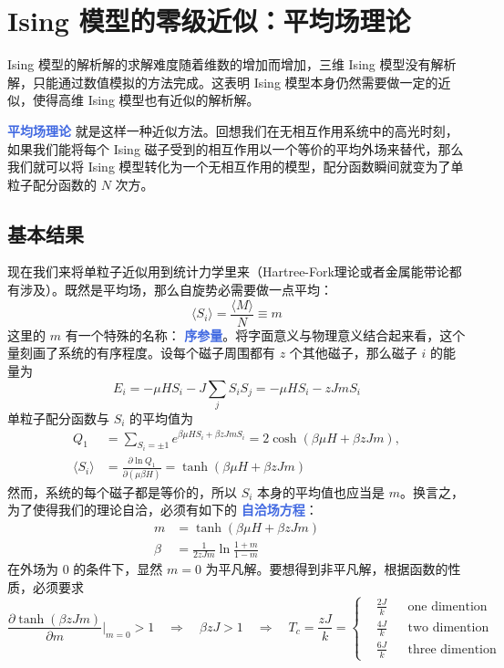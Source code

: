 \section{Ising 模型的零级近似：平均场理论}\label{sec:Ising 模型的零级近似：平均场理论}

Ising 模型的解析解的求解难度随着维数的增加而增加，三维 Ising 模型没有解析解，只能通过数值模拟的方法完成。这表明 Ising 模型本身仍然需要做一定的近似，使得高维 Ising 模型也有近似的解析解。

\textcolor{RoyalBlue}{\textbf{\kaishu 平均场理论}}  就是这样一种近似方法。回想我们在无相互作用系统中的高光时刻，如果我们能将每个 Ising 磁子受到的相互作用以一个等价的平均外场来替代，那么我们就可以将 Ising 模型转化为一个无相互作用的模型，配分函数瞬间就变为了单粒子配分函数的 $N$ 次方。

\subsection{基本结果}\label{sub:基本结果}
现在我们来将单粒子近似用到统计力学里来（Hartree-Fork理论或者金属能带论都有涉及）。既然是平均场，那么自旋势必需要做一点平均：
\begin{equation}
    \langle S_i \rangle = \frac{\langle M \rangle}{N} \equiv m
\end{equation}
这里的 $m$ 有一个特殊的名称： \textcolor{RoyalBlue}{\textbf{\kaishu 序参量}}。将字面意义与物理意义结合起来看，这个量刻画了系统的有序程度。设每个磁子周围都有 $z$ 个其他磁子，那么磁子 $i$ 的能量为
\begin{equation}
    E_i = -\mu HS_i - J \sum_j S_i S_j = -\mu HS_i - zJmS_i
\end{equation}
单粒子配分函数与 $S_i$ 的平均值为
\begin{align}
    Q_1 &= \sum_{S_i = \pm 1} e^{\beta \mu HS_i + \beta zJmS_i} = 2\cosh (\beta \mu H + \beta zJm),\\
    \langle S_i \rangle &= \frac{\partial \ln Q_1}{\partial (\mu\beta H)} = \tanh (\beta \mu H + \beta zJm)
\end{align}
然而，系统的每个磁子都是等价的，所以 $S_i$ 本身的平均值也应当是 $m$。换言之，为了使得我们的理论自洽，必须有如下的 \textcolor{RoyalBlue}{\textbf{\kaishu 自洽场方程}}：
\begin{equation}
    \begin{aligned}
        m &= \tanh (\beta \mu H + \beta zJm)\\
        \beta &= \frac{1}{2zJm} \ln \frac{1+m}{1-m} 
    \end{aligned}
\end{equation}
在外场为 $0$ 的条件下，显然 $m = 0$ 为平凡解。要想得到非平凡解，根据函数的性质，必须要求
\begin{equation}
    \frac{\partial \tanh (\beta zJm)}{\partial m} \bigg|_{m = 0} > 1 \quad \Rightarrow \quad \beta zJ > 1 \quad \Rightarrow \quad T_c = \frac{zJ}{k} = \left\{\begin{aligned}
        &\frac{2J}{k} && \text{one dimention} \\
        &\frac{4J}{k} && \text{two dimention} \\
        &\frac{6J}{k} && \text{three dimention} 
    \end{aligned}\right.
\end{equation}

